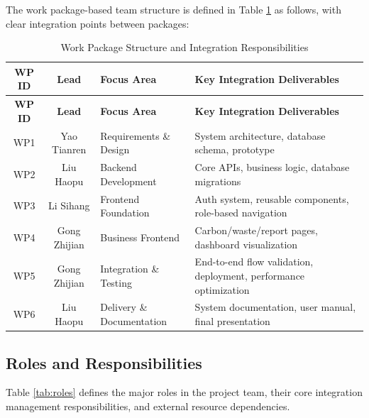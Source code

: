 \documentclass[12pt,a4paper]{article}
\begin{document}
The work package-based team structure is defined in Table \ref{workpackage} as follows, with clear integration points between packages:
{\footnotesize
\begin{longtable}{@{}c c l >{\raggedright\arraybackslash}p{6.5cm}@{}}
\caption{Work Package Structure and Integration Responsibilities}\label{workpackage}\\
\toprule
\textbf{WP ID} & \textbf{Lead} & \textbf{Focus Area} & \textbf{Key Integration Deliverables} \\
\midrule
\endfirsthead
\toprule
\textbf{WP ID} & \textbf{Lead} & \textbf{Focus Area} & \textbf{Key Integration Deliverables} \\
\midrule
\endhead
WP1 & Yao Tianren & Requirements \& Design & System architecture, database schema, prototype \\
WP2 & Liu Haopu & Backend Development & Core APIs, business logic, database migrations \\
WP3 & Li Sihang & Frontend Foundation & Auth system, reusable components, role-based navigation \\
WP4 & Gong Zhijian & Business Frontend & Carbon/waste/report pages, dashboard visualization \\
WP5 & Gong Zhijian & Integration \& Testing & End-to-end flow validation, deployment, performance optimization \\
WP6 & Liu Haopu & Delivery \& Documentation & System documentation, user manual, final presentation \\
\bottomrule
\end{longtable}
}

\subsection{Roles and Responsibilities}
Table \ref{tab:roles} defines the major roles in the project team, their core integration management responsibilities, and external resource dependencies.
\end{document}
